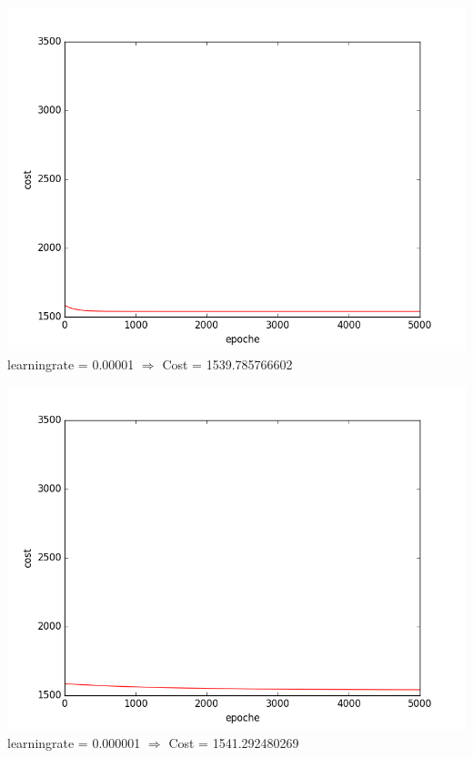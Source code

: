 \documentclass[12pt]{article}
\begin{document}
\begin{enumerate}[a)]
                \begin{center}
                    \includegraphics[scale = 0.52]{pictures/cost5000_w-20,0_b619,0_learn0,00001}\\
                    learningrate = 0.00001 $\Rightarrow$ Cost = 1539.785766602\\
                \end{center}

                \begin{center}
                    \includegraphics[scale = 0.52]{pictures/cost5000_w-20,0_b619,0_learn0,000001}\\
                    learningrate = 0.000001 $\Rightarrow$ Cost = 1541.292480269\\
                \end{center}


\end{enumerate}
\end{document}
